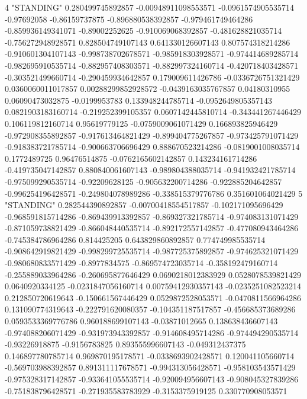 4 "STANDING" 0.280499745892857 -0.00948911098553571 -0.0961574905535714 -0.97692058 -0.86159737875 -0.896880538392857 -0.979461749464286 -0.859936149341071 -0.89002252625 -0.910069068392857 -0.481628821035714 -0.756272948928571 0.828504749107143 0.641330126607143 0.807574318214286 -0.910601304107143 -0.998738702678571 -0.985918303928571 -0.974414689285714 -0.982695910535714 -0.882957408303571 -0.882997324160714 -0.420718403428571 -0.303521499660714 -0.290459934642857 0.179009611426786 -0.0336726751321429 0.0360060011017857 0.00288299852928572 -0.0439163035767857 0.04180310955 0.06090473032875 -0.0199953783 0.133948244785714 -0.0952649805357143 0.0821903183160714 -0.219252399105357 0.0607142445810714 -0.343441267446429 0.106119812160714 0.95619779125 -0.0759009061071429 0.166893825946429 -0.972908355892857 -0.917613464821429 -0.899404775267857 -0.973425791071429 -0.918383721785714 -0.900663706696429 0.888670523214286 -0.0819001008035714 0.1772489725 0.96476514875 -0.0762165602142857 0.143234161714286 -0.419735047142857 0.880840061607143 -0.989804388035714 -0.941932421785714 -0.975099290535714 -0.92209628125 -0.905632200714286 -0.922885204642857 -0.996254196428571 -0.249804078989286 -0.338515379776786 0.351601064021429
5 "STANDING" 0.282544390892857 -0.00700418554517857 -0.102171095696429 -0.968591815714286 -0.869439913392857 -0.869327321785714 -0.974083131071429 -0.871059738821429 -0.866048440535714 -0.892172557142857 -0.477080943464286 -0.745384786964286 0.814425205 0.643829860892857 0.774749985535714 -0.908642919821429 -0.998299725535714 -0.987725375892857 -0.974625321071429 -0.980680833571429 -0.8977834575 -0.869574723035714 -0.358192479160714 -0.255889033964286 -0.260695877646429 0.0690218012383929 0.0528078539821429 0.0640920334125 -0.0231847056160714 0.00759412930357143 -0.0235251082523214 0.212850720619643 -0.150661567446429 0.0529872528053571 -0.0470811566964286 0.131090774319643 -0.222791620080357 -0.104351187517857 -0.456685373689286 0.0593533369776786 0.960188699107143 -0.03871012665 0.138638436607143 -0.974088206071429 -0.931973943392857 -0.914608495714286 -0.974494290535714 -0.93226918875 -0.9156783825 0.893555996607143 -0.049312437375 0.146897780785714 0.969870195178571 -0.0338693902428571 0.120041105660714 -0.569703988392857 0.891311117678571 -0.994313056428571 -0.958103543571429 -0.975328317142857 -0.933641055535714 -0.920094956607143 -0.908045327839286 -0.751838796428571 -0.271935583783929 -0.3153375919125 0.330770908053571
